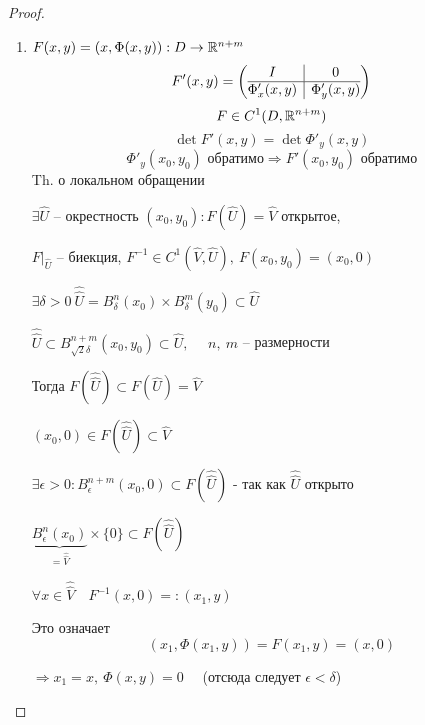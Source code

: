    \begin{proof}
        $ $
        \begin{enumerate}
            \item $F(x, y) = (x, \Phi(x, y)) : D \rightarrow \mathbb{R}^{n + m}$
                \[
                    F'(x, y) = \left(\begin{array}{@{}c|c@{}}
                        I & 0 \\
                        \hline
                        \Phi'_x(x, y) & \Phi'_y(x, y)
                      \end{array}\right)  
                \]
                \[
                      F \in C^1(D, \mathbb{R}^{n+m})
                \]
                \[
                      \det F'(x, y) = \det \Phi'_y(x, y)
                \]
                \[
                      \Phi'_y(x_0, y_0) \text{ обратимо} \Rightarrow F'(x_0, y_0) \text{ обратимо}
                \]
                Th. о локальном обращении
                \par $\exists \widehat U$ -- окрестность $(x_0, y_0) : F(\widehat U) = \widehat V$ открытое,
                \par $F\big|_{\widehat U}$ -- биекция, $F^{-1} \in C^1(\widehat V, \widehat U), \ F(x_0, y_0) = (x_0, 0)$
                \par $\exists \delta > 0 \ \widehat{\widehat U} = B_\delta^n(x_0) \times B_\delta^m(y_0) \subset \widehat U$
                \par $\widehat{\widehat U} \subset B_{\sqrt{2}\delta}^{n + m}(x_0, y_0) \subset \widehat{U}, \quad$ $n, \ m$ -- размерности
                \par Тогда $F(\widehat{\widehat U}) \subset F(\widehat U) = \widehat V$
                \par $(x_0, 0) \in F(\widehat{\widehat U}) \subset \widehat V$
                \par $\exists \epsilon > 0 : B_\epsilon^{n+m}(x_0, 0) \subset F(\widehat {\widehat U})$ - так как $\widehat {\widehat U} $ открыто
                \par $\underbrace{B^n_\epsilon(x_0)}_{= \widehat{\widehat V}} \times \{0\} \subset F(\widehat{\widehat U})$
                \par $\forall x \in \widehat{\widehat V} \quad F^{-1}(x, 0) =: (x_1, y)$
                \par Это означает
                \[
                      (x_1, \Phi(x_1, y)) = F(x_1, y) = (x, 0)
                \]
                \par $\Rightarrow x_1 = x, \ \Phi(x, y) = 0 \quad$ (отсюда следует $\epsilon < \delta$)

\end{enumerate}
\end{proof}
